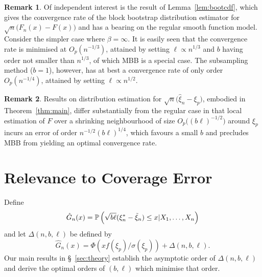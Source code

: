 \documentclass[a4paper, 12pt]{article}
\theoremstyle{plain}
\theoremstyle{definition}
\newcommand{\prob}{{\Bbb P}}
\newtheorem{remark}{Remark}
\begin{document}
\begin{remark}
\label{remark:lemma}
Of independent interest is the result of Lemma~\ref{lem:bootcdf}, which gives the convergence rate
 of the block bootstrap distribution estimator for $\sqrt{n}\big(F_n(x)-F(x)\big)$ and has a bearing on the regular smooth function model. 
 Consider the simpler case where $\beta=\infty$. It is easily seen that the convergence rate is minimised at $O_p(n^{-1/3})$,
 attained by setting 
 $\ell\propto n^{1/3}$ and $b$ having order not smaller than $n^{1/3}$, of which MBB is a special case.
 The subsampling method ($b=1$), however, has at best a convergence rate of only order $O_p(n^{-1/4})$, attained
 by setting $\ell\propto n^{1/2}$.
 \end{remark}

\begin{remark}
Results on distribution estimation for $\sqrt{n}\big(\hat\xi_n-\xi_p\big)$, embodied in Theorem~\ref{thm:main}, differ substantially
from the regular case in that local estimation of $F$ over a shrinking neighbourhood of size $O_p\big((b\ell)^{-1/2}\big)$ around
$\xi_p$ incurs an error of order $n^{-1/2}(b\ell)^{1/4}$, which favours a small $b$ and precludes MBB
from yielding an optimal convergence rate.
\end{remark}

\section{Relevance to Coverage Error}
\label{cov.error}
Define 
\begin{equation*}
    \hat{G}_{n}(x)=\prob\left(\sqrt{b\ell}(\xi_{n}^{*}-\tilde{\xi}_{n})\leq x \vert X_{1}, \ldots, X_{n} \right)
    \end{equation*}
    and let $\Delta(n,b,\ell)$ be defined by
\begin{equation} \label{delta-coverage}
\hat{G}_{n}(x)=\Phi \left(xf(\xi_{p})/\sigma(\xi_{p})\right) + \Delta(n, b, \ell) .
\end{equation}
Our main results in \S~\ref{sec:theory} establish the asymptotic order of $\Delta(n,b,\ell)$ and derive the optimal orders of $(b,\ell)$ which minimise that order.
\end{document}
